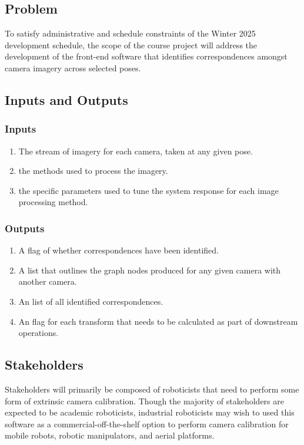 \documentclass{article}
\begin{document}
\subsection{Problem}
To satisfy administrative and schedule constraints of the Winter 2025 development schedule, the scope of the 
course project will address the development of the front-end software that identifies 
correspondences amongst camera imagery across selected poses.

\subsection{Inputs and Outputs}
\subsubsection{Inputs}
\begin{enumerate}
    \item The stream of imagery for each camera, taken at any given pose.
    \item the methods used to process the imagery.
    \item the specific parameters used to tune the system response for each image processing method.
\end{enumerate}  

\subsubsection{Outputs}
\begin{enumerate}
    \item A flag of whether correspondences have been identified.
    \item A list that outlines the graph nodes produced for any given camera 
    with another camera.
    \item An list of all identified correspondences.
    \item An flag for each transform that needs to be calculated as part 
    of downstream operations.
\end{enumerate}  

\subsection{Stakeholders}
Stakeholders will primarily be composed of roboticists that need to perform some 
form of extrinsic camera calibration. 
Though the majority of stakeholders are expected to be academic roboticists, 
industrial roboticists may wish to used this software as a 
commercial-off-the-shelf option to perform camera calibration for mobile 
robots, robotic manipulators, and aerial platforms.
\end{document}
